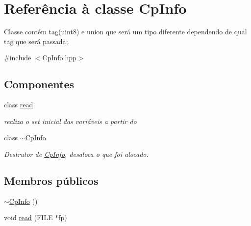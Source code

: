 \hypertarget{class_cp_info}{}\section{Referência à classe Cp\+Info}
\label{class_cp_info}


Classe contém tag(uint8) e union que será um tipo diferente dependendo de qual tag que será passada;.  




{\ttfamily \#include $<$Cp\+Info.\+hpp$>$}

\subsection*{Componentes}
\begin{DoxyCompactItemize}
\item 
class \hyperlink{class_cp_info_1_1read}{read}
\begin{DoxyCompactList}\small\item\em realiza o set inicial das variáveis a partir do \end{DoxyCompactList}\item 
class \hyperlink{class_cp_info_1_1~_cp_info}{$\sim$\+Cp\+Info}
\begin{DoxyCompactList}\small\item\em Destrutor de \hyperlink{class_cp_info}{Cp\+Info}, desaloca o que foi alocado. \end{DoxyCompactList}\end{DoxyCompactItemize}
\subsection*{Membros públicos}
\begin{DoxyCompactItemize}
\item 
\hyperlink{class_cp_info_a67ca1fe35f94943081010ec05cb7d464}{$\sim$\+Cp\+Info} ()
\item 
void \hyperlink{class_cp_info_ab8c89df973cc40b407e0cdd4911923f1}{read} (F\+I\+LE $\ast$fp)
\end{DoxyCompactItemize}
